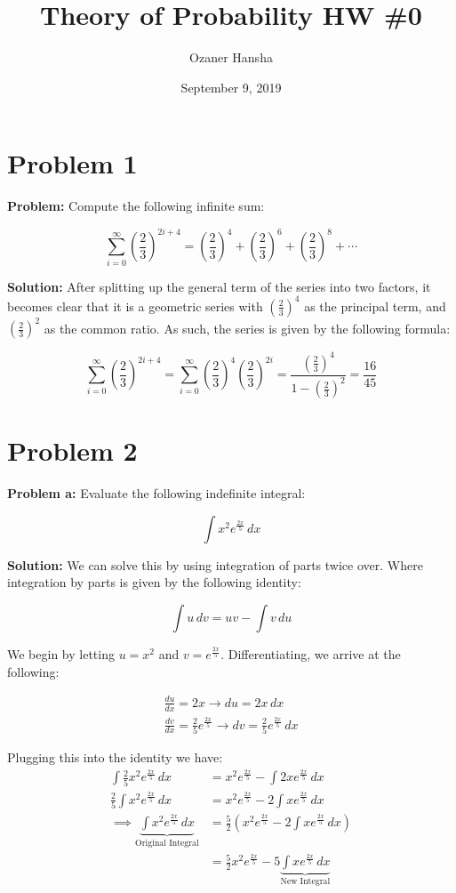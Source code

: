 \documentclass{article}
\begin{document}
\title{Theory of Probability HW \#0}
\author{Ozaner Hansha}
\date{September 9, 2019}
\maketitle

\newcommand*\Eval[3]{\left[#1\right]_{#2}^{#3}}

\section*{Problem 1}
\noindent\textbf{Problem:} Compute the following infinite sum:

$$\sum_{i=0}^\infty\left(\frac{2}{3}\right)^{2i+4}=\left(\frac{2}{3}\right)^4+\left(\frac{2}{3}\right)^6+\left(\frac{2}{3}\right)^8+\cdots$$

\noindent\textbf{Solution:} After splitting up the general term of the series into two factors, it becomes clear that it is a geometric series with $\left(\frac{2}{3}\right)^4$ as the principal term, and $\left(\frac{2}{3}\right)^2$ as the common ratio. As such, the series is given by the following formula:

$$\sum_{i=0}^\infty\left(\frac{2}{3}\right)^{2i+4}=\sum_{i=0}^\infty\left(\frac{2}{3}\right)^4\left(\frac{2}{3}\right)^{2i}=\frac{\left(\frac{2}{3}\right)^4}{1-\left(\frac{2}{3}\right)^2}=\frac{16}{45}$$

\section*{Problem 2}
\noindent\textbf{Problem a:} Evaluate the following indefinite integral:

$$\int x^2e^{\frac{2x}{5}}\, dx$$

\noindent\textbf{Solution:} We can solve this by using integration of parts twice over. Where integration by parts is given by the following identity:

$$\int u\,dv=uv-\int v\,du$$

We begin by letting $u=x^2$ and $v=e^{\frac{2x}{5}}$. Differentiating, we arrive at the following:

\begin{gather*}
    \frac{du}{dx}=2x\rightarrow du=2x\,dx\\
    \frac{dv}{dx}=\frac{2}{5}e^{\frac{2x}{5}}\rightarrow dv=\frac{2}{5}e^{\frac{2x}{5}}\,dx
\end{gather*}

Plugging this into the identity we have:
\begin{align*}
    \int \frac{2}{5}x^2e^{\frac{2x}{5}}\,dx&=x^2e^{\frac{2x}{5}}-\int 2xe^{\frac{2x}{5}}\,dx\\
    \frac{2}{5}\int x^2e^{\frac{2x}{5}}\,dx&=x^2e^{\frac{2x}{5}}-2\int xe^{\frac{2x}{5}}\,dx\\
    \implies\underbrace{\int x^2e^{\frac{2x}{5}}\,dx}_{\text{Original Integral}}&=\frac{5}{2}(x^2e^{\frac{2x}{5}}-2\int xe^{\frac{2x}{5}}\,dx)\\
    &=\frac{5}{2}x^2e^{\frac{2x}{5}}-5\underbrace{\int xe^{\frac{2x}{5}}\,dx}_{\text{New Integral}}
\end{align*}
\end{document}
